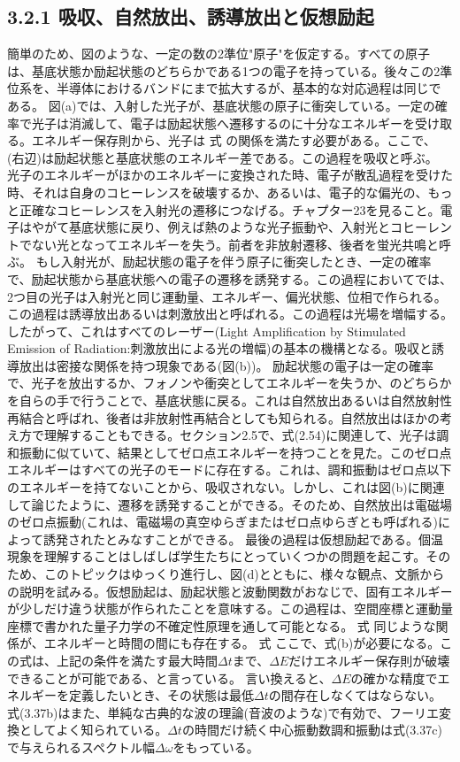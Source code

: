 \documentclass[11pt,a4j,uplatex]{jsarticle}
\begin{document}
\subsection{3.2.1 吸収、自然放出、誘導放出と仮想励起}
簡単のため、図のような、一定の数の2準位"原子"を仮定する。すべての原子は、基底状態か励起状態のどちらかである1つの電子を持っている。後々この2準位系を、半導体におけるバンドにまで拡大するが、基本的な対応過程は同じである。
図(a)では、入射した光子が、基底状態の原子に衝突している。一定の確率で光子は消滅して、電子は励起状態へ遷移するのに十分なエネルギーを受け取る。エネルギー保存則から、光子は
式
の関係を満たす必要がある。ここで、(右辺)は励起状態と基底状態のエネルギー差である。この過程を吸収と呼ぶ。
光子のエネルギーがほかのエネルギーに変換された時、電子が散乱過程を受けた時、それは自身のコヒーレンスを破壊するか、あるいは、電子的な偏光の、もっと正確なコヒーレンスを入射光の遷移につなげる。チャプター23を見ること。電子はやがて基底状態に戻り、例えば熱のような光子振動や、入射光とコヒーレントでない光となってエネルギーを失う。前者を非放射遷移、後者を蛍光共鳴と呼ぶ。
もし入射光が、励起状態の電子を伴う原子に衝突したとき、一定の確率で、励起状態から基底状態への電子の遷移を誘発する。この過程においてでは、2つ目の光子は入射光と同じ運動量、エネルギー、偏光状態、位相で作られる。この過程は誘導放出あるいは刺激放出と呼ばれる。この過程は光場を増幅する。したがって、これはすべてのレーザー(Light Amplification by Stimulated Emission of Radiation:刺激放出による光の増幅)の基本の機構となる。吸収と誘導放出は密接な関係を持つ現象である(図(b))。
励起状態の電子は一定の確率で、光子を放出するか、フォノンや衝突としてエネルギーを失うか、のどちらかを自らの手で行うことで、基底状態に戻る。これは自然放出あるいは自然放射性再結合と呼ばれ、後者は非放射性再結合としても知られる。自然放出はほかの考え方で理解することもできる。セクション2.5で、式(2.54)に関連して、光子は調和振動に似ていて、結果としてゼロ点エネルギーを持つことを見た。このゼロ点エネルギーはすべての光子のモードに存在する。これは、調和振動はゼロ点以下のエネルギーを持てないことから、吸収されない。しかし、これは図(b)に関連して論じたように、遷移を誘発することができる。そのため、自然放出は電磁場のゼロ点振動(これは、電磁場の真空ゆらぎまたはゼロ点ゆらぎとも呼ばれる)によって誘発されたとみなすことができる。
最後の過程は仮想励起である。個温現象を理解することはしばしば学生たちにとっていくつかの問題を起こす。そのため、このトピックはゆっくり進行し、図(d)とともに、様々な観点、文脈からの説明を試みる。仮想励起は、励起状態と波動関数がおなじで、固有エネルギーが少しだけ違う状態が作られたことを意味する。この過程は、空間座標と運動量座標で書かれた量子力学の不確定性原理を通して可能となる。
式
同じような関係が、エネルギーと時間の間にも存在する。
式
ここで、式(b)が必要になる。この式は、上記の条件を満たす最大時間$\Delta t$まで、$\Delta E$だけエネルギー保存則が破壊できることが可能である、と言っている。%
言い換えると、$\Delta E$の確かな精度でエネルギーを定義したいとき、その状態は最低$\Delta t$の間存在しなくてはならない。式(3.37b)はまた、単純な古典的な波の理論(音波のような)で有効で、フーリエ変換としてよく知られている。$\Delta t$の時間だけ続く中心振動数調和振動は式(3.37c)で与えられるスペクトル幅$\Delta \omega$をもっている。
\end{document}
